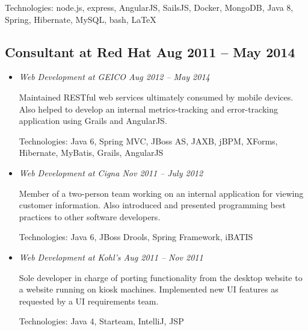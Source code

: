 \documentclass[12pt]{article}
\begin{document}
Technologies: node.js, express, AngularJS, SailsJS, Docker, MongoDB, Java 8,
Spring, Hibernate, MySQL, bash, \LaTeX

\subsection*{Consultant at Red Hat \hfill Aug 2011 -- May 2014}

  \begin{itemize}

    \item \textit{Web Development at GEICO \hfill Aug 2012 -- May 2014}

      Maintained RESTful web services ultimately consumed by mobile devices.
      Also helped to develop an internal metrics-tracking and error-tracking
      application using Grails and AngularJS.

      Technologies: Java 6, Spring MVC, JBoss AS, JAXB, jBPM, XForms, Hibernate,
      MyBatis, Grails, AngularJS

%

    \item \textit{Web Development at Cigna \hfill Nov 2011 -- July 2012}

      Member of a two-person team working on an internal application for viewing
      customer information. Also introduced and presented programming best
      practices to other software developers.

      Technologies: Java 6, JBoss Drools, Spring Framework, iBATIS

    \item \textit{Web Development at Kohl's \hfill Aug 2011 -- Nov 2011}

      Sole developer in charge of porting functionality from the desktop website
      to a website running on kiosk machines. Implemented new UI features as
      requested by a UI requirements team.

      Technologies: Java 4, Starteam, IntelliJ, JSP

  \end{itemize}
\end{document}
